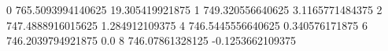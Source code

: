 0 765.5093994140625 19.305419921875
1 749.320556640625 3.1165771484375
2 747.4888916015625 1.284912109375
4 746.5445556640625 0.340576171875
6 746.2039794921875 0.0
8 746.07861328125 -0.1253662109375
